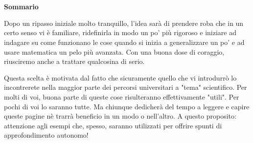 \chapter*{}
\begin{center} \textbf{\Large{Sommario}} \end{center}
\quad \; Dopo un ripasso iniziale molto tranquillo, l’idea sarà di prendere roba che in un certo senso vi è familiare, ridefinirla in modo un po' più rigoroso e iniziare ad indagare su come funzionano le cose quando si inizia a generalizzare un po' e ad usare matematica un pelo più avanzata. Con una buona dose di coraggio, riusciremo anche a trattare qualcosina di serio. 

Questa scelta è motivata dal fatto che sicuramente quello che vi introdurrò lo incontrerete nella maggior parte dei percorsi universitari a "tema" scientifico. Per molti di voi, buona parte di queste cose risulteranno effettivamente "utili". Per pochi di voi lo saranno tutte. Ma chiunque dedicherà del tempo a leggere e capire queste pagine nè trarrà beneficio in un modo o nell'altro. A questo proposito: attenzione agli esempi che, spesso, saranno utilizzati per offrire spunti di approfondimento autonomo!


